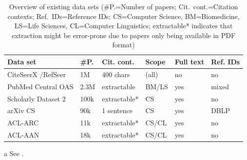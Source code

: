 \begin{table}[tb]
 \caption[Overview of existing data sets]{Overview of existing data sets (\#P.=Number of papers; Cit.\ cont.=Citation contexts; Ref.\ IDs=Reference IDs; CS=Computer Science, BM=Biomedicine, LS=Life Sciences, CL=Computer Linguistics; extractable* indicates that extraction might be error-prone due to papers only being available in PDF format)}
 \label{tab:existing-data-sets}
  \centering
  \begin{small}
 \begin{threeparttable}
 \begin{tabular}{llllll}
 \toprule
   Data set & \#P. & Cit. cont. & Scope & Full text & Ref. IDs \\
   \midrule
   CiteSeerX \cite{Caragea2014}/RefSeer \cite{Huang2015fixed} &  1M & 400 chars & (all) & no & no \\
   PubMed Central OAS\tnote{a} & 2.3M & extractable & BM/LS & yes & mixed \\
   Scholarly Dataset 2 \cite{Sugiyama2015} & 100k & extractable* & CS & yes & no \\
   arXiv CS \cite{Faerber2018LREC}   &  90k & 1 sentence & CS & yes & DBLP \\
   ACL-ARC \cite{Bird2008ACLARC} & 11k & extractable* & CS/CL & yes & no \\
   ACL-AAN \cite{Radev2013} & 18k & extractable* & CS/CL & yes & no  \\
   \bottomrule
 \end{tabular}
 \begin{tablenotes}
    \item[a] See .
  \end{tablenotes}
\end{threeparttable}
  \end{small}
\end{table}

